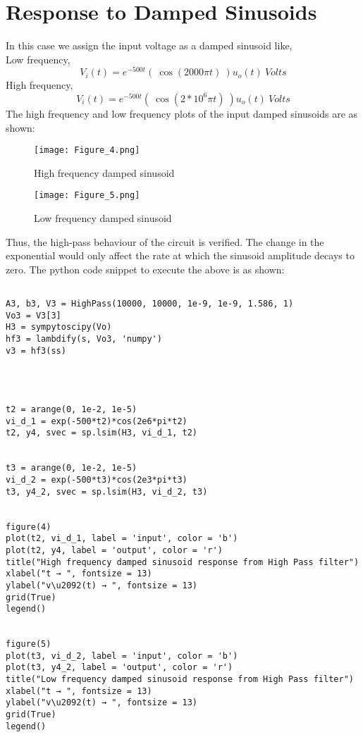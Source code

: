 \documentclass[11pt, a4paper]{article}
\begin{document}
\section*{Response to Damped Sinusoids}
In this case we assign the input voltage as a damped sinusoid like,\\
Low frequency,
\begin{equation*}
    V_{i}(t) = e^{-500t}( \ \cos(2000\pi t) \ )u_{o}(t) \ Volts
\end{equation*}
High frequency,
\begin{equation*}
    V_{i}(t) = e^{-500t}( \ \cos(2*10^{6}\pi t) \ )u_{o}(t) \ Volts
\end{equation*}
The high frequency and low frequency plots of the input damped sinusoids are as shown:\newpage
\begin{figure}[!tbh]
   	\centering
   	\texttt{[image: Figure\_4.png]}
   	\label{fig:32}
   	\caption{High frequency damped sinusoid}
   \end{figure}
\begin{figure}[!tbh]
   	\centering
   	\texttt{[image: Figure\_5.png]}
   	\label{fig:32}
   	\caption{Low frequency damped sinusoid}
   \end{figure}
   
   Thus, the high-pass behaviour of the circuit is verified.  The change in the exponential would only affect the rate at which the sinusoid amplitude decays to zero.
The python code snippet to execute the above is as shown:
\begin{verbatim}
    
A3, b3, V3 = HighPass(10000, 10000, 1e-9, 1e-9, 1.586, 1)
Vo3 = V3[3]
H3 = sympytoscipy(Vo)
hf3 = lambdify(s, Vo3, 'numpy')
v3 = hf3(ss)




t2 = arange(0, 1e-2, 1e-5) 
vi_d_1 = exp(-500*t2)*cos(2e6*pi*t2)
t2, y4, svec = sp.lsim(H3, vi_d_1, t2)


t3 = arange(0, 1e-2, 1e-5)    
vi_d_2 = exp(-500*t3)*cos(2e3*pi*t3)
t3, y4_2, svec = sp.lsim(H3, vi_d_2, t3)


figure(4)
plot(t2, vi_d_1, label = 'input', color = 'b')
plot(t2, y4, label = 'output', color = 'r')
title("High frequency damped sinusoid response from High Pass filter")
xlabel("t → ", fontsize = 13)
ylabel("v\u2092(t) → ", fontsize = 13)
grid(True)
legend()


figure(5)
plot(t3, vi_d_2, label = 'input', color = 'b')
plot(t3, y4_2, label = 'output', color = 'r')
title("Low frequency damped sinusoid response from High Pass filter")
xlabel("t → ", fontsize = 13)
ylabel("v\u2092(t) → ", fontsize = 13)
grid(True)
legend()
\end{verbatim}
\end{document}

